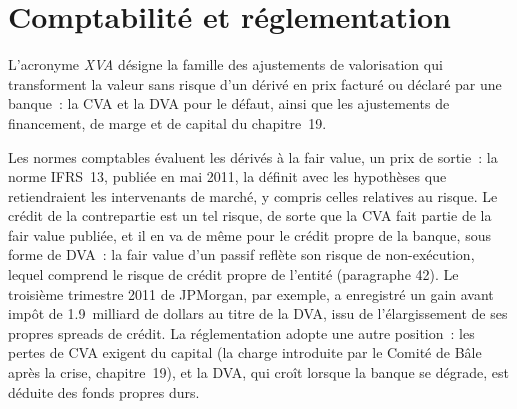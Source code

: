 \begin{omfigure}

\label{fig:rc:credit-and-debit-valuation-adjustments:cs01}
\end{omfigure}

\section{Comptabilité et réglementation}

\begin{definition}[XVA]\label{def:rc:credit-and-debit-valuation-adjustments:xva}
L'acronyme \emph{XVA} désigne la famille des ajustements de valorisation qui transforment la
valeur sans risque d'un dérivé en prix facturé ou déclaré par une banque~: la CVA et la DVA pour le défaut, ainsi que les
ajustements de financement, de marge et de capital du chapitre~19.
\end{definition}

Les normes comptables évaluent les dérivés à la fair value, un prix de sortie~: la norme IFRS~13, publiée en mai
2011, la définit avec les hypothèses que retiendraient les intervenants de marché, y compris celles relatives au risque.
Le crédit de la contrepartie est un tel risque, de sorte que la CVA fait partie de la fair value publiée, et il en va de même pour le
crédit propre de la banque, sous forme de DVA~: la fair value d'un passif reflète son risque de non-exécution, lequel
comprend le risque de crédit propre de l'entité (paragraphe 42). Le troisième trimestre 2011 de JPMorgan, par exemple,
a enregistré un gain avant impôt de 1.9~milliard de dollars au titre de la DVA, issu de l'élargissement de ses propres spreads de crédit. La réglementation adopte une autre position~: les pertes de CVA exigent du capital (la
charge introduite par le Comité de Bâle après la crise, chapitre~19), et la DVA, qui croît lorsque
la banque se dégrade, est déduite des fonds propres durs.

